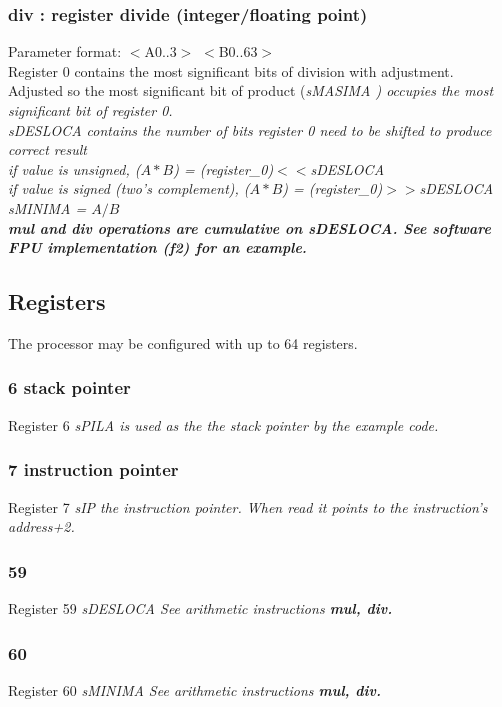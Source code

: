 \documentclass[a4paper,11pt]{article}
\begin{document}
\subsubsection{div : register divide (integer/floating point)} 
 Parameter format: $<$A0..3$>$ $<$B0..63$>$\\
 Register 0 contains the most significant bits of division with adjustment.\\
  Adjusted so the most significant bit of product (\sl sMASIMA \rm) occupies the most significant bit of register 0.\\
 \sl sDESLOCA \rm contains the number of bits register 0 need to be shifted to produce correct result\\
  if value is unsigned, ($A*B$) = (register\_0)$<<$\sl sDESLOCA \rm\\
  if value is signed (two's complement), ($A*B$) = (register\_0)$>>$\sl sDESLOCA \rm\\
 \sl sMINIMA \rm = $A/B$\\
 
 \bf mul \rm and \bf div \rm operations are cumulative on \sl sDESLOCA\rm. See software FPU implementation (f2) for an example.\\
 
\subsection{Registers}
The processor may be configured with up to 64 registers.

\subsubsection{6 stack pointer}
Register 6 \sl sPILA \rm is used as the the stack pointer by the example code.

\subsubsection{7 instruction pointer}
Register 7 \sl sIP \rm the instruction pointer. When read it points to the instruction's address+2.

\subsubsection{59 }
Register 59 \sl sDESLOCA \rm See arithmetic instructions \bf mul\rm, \bf div\rm.

\subsubsection{60}
Register 60 \sl sMINIMA \rm See arithmetic instructions \bf mul\rm, \bf div\rm.
\end{document}
